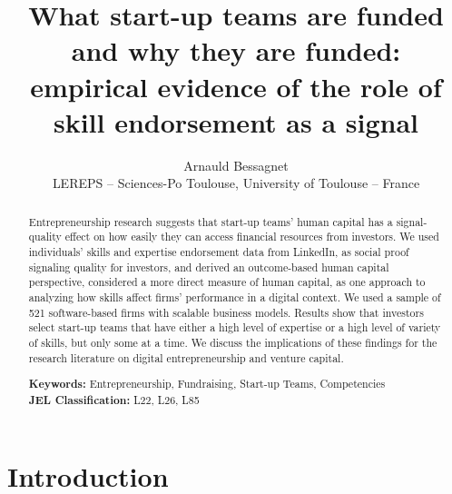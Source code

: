 \documentclass[12pt]{article}
\begin{document}
\title{What start-up teams are funded and why they are funded: \\ empirical evidence of the role of skill endorsement as a signal}
\date{\vspace{-3ex}}
\author{Arnauld Bessagnet \\ \footnotesize{LEREPS – Sciences-Po Toulouse, University of Toulouse – France} \\}

\maketitle \vspace{-1,5em}

\begin{abstract}
\noindent
Entrepreneurship research suggests that start-up teams' human capital has a signal-quality effect on how easily they can access financial resources from investors. We used individuals' skills and expertise endorsement data from LinkedIn, as social proof signaling quality for investors, and derived an outcome-based human capital perspective, considered a more direct measure of human capital, as one approach to analyzing how skills affect firms’ performance in a digital context. We used a sample of 521 software-based firms with scalable business models. Results show that investors select start-up teams that have either a high level of expertise or a high level of variety of skills, but only some at a time. We discuss the implications of these findings for the research literature on digital entrepreneurship and venture capital. \newline

\begin{obeylines}
\noindent \footnotesize{}{\textbf{Keywords:} Entrepreneurship, Fundraising, Start-up Teams, Competencies}
\noindent \footnotesize{\textbf{JEL Classification:} L22, L26, L85}
\end{obeylines}

\end{abstract}

\clearpage
\section{Introduction}
\end{document}
